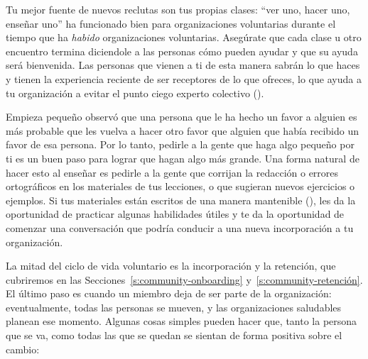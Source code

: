 Tu mejor fuente de nuevos reclutas son tus propias clases:
``ver uno, hacer uno, enseñar uno'' ha funcionado bien para organizaciones voluntarias
durante el tiempo que ha \emph{habido} organizaciones voluntarias.
Asegúrate que cada clase u otro encuentro
termina diciendole a las personas cómo pueden ayudar y que su ayuda será bienvenida.
Las personas que vienen a ti de esta manera sabrán lo que haces
y tienen la experiencia reciente de ser receptores de lo que ofreces,
lo que ayuda a tu organización a evitar el punto ciego experto colectivo ().

\begin{aside}{Empieza pequeño}
   observó que
  una persona que le ha hecho un favor a alguien
  es más probable que les vuelva a hacer otro favor
  que alguien que había recibido un favor de esa persona.
  Por lo tanto, pedirle a la gente que haga algo pequeño por ti
  es un buen paso para lograr que hagan algo más grande.
  Una forma natural de hacer esto al enseñar
  es pedirle a la gente que corrijan la redacción o errores ortográficos en los materiales de tus lecciones,
  o que sugieran nuevos ejercicios o ejemplos.
  Si tus materiales están escritos de una manera mantenible (),
  les da la oportunidad de practicar algunas habilidades útiles
  y te da la oportunidad de comenzar una conversación
  que podría conducir a una nueva incorporación a tu organización.
\end{aside}


La mitad del ciclo de vida voluntario es la incorporación y la retención,
que cubriremos en las Secciones~\ref{s:community-onboarding} y~\ref{s:community-retención}.
El último paso es cuando un miembro deja de ser parte de la organización:
eventualmente, todas las personas se mueven,
y las organizaciones saludables planean ese momento.
Algunas cosas simples pueden hacer que, tanto la persona que se va, como todas las que se quedan
se sientan de forma positiva sobre el cambio:

